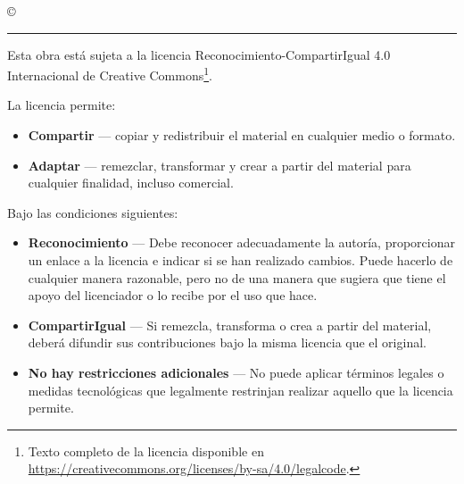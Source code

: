 \thispagestyle{empty}

\hfill

\vfill

\textit{\myTitle} \copyright\ \myTime \myName \\ \bigskip

\par\vspace*{\dimexpr-\parskip-\baselineskip+6pt}
\noindent\rule{\textwidth}{0.5pt}

Esta obra está sujeta a la licencia Reconocimiento-CompartirIgual 4.0 Internacional de Creative Commons\footnote{Texto completo de la licencia disponible en \url{https://creativecommons.org/licenses/by-sa/4.0/legalcode}.}.

La licencia permite:
\begin{itemize}
	\item[] \textbf{Compartir} --- copiar y redistribuir el material en cualquier medio o formato.
	\item[] \textbf{Adaptar} --- remezclar, transformar y crear a partir del material
para cualquier finalidad, incluso comercial.
\end{itemize}

Bajo las condiciones siguientes:
\begin{itemize}
	\item[] \textbf{Reconocimiento} --- Debe reconocer adecuadamente la autoría, proporcionar un enlace a la licencia e indicar si se han realizado cambios. Puede hacerlo de cualquier manera razonable, pero no de una manera que sugiera que tiene el apoyo del licenciador o lo recibe por el uso que hace. 
	\item[] \textbf{CompartirIgual} --- Si remezcla, transforma o crea a partir del material, deberá difundir sus contribuciones bajo la misma licencia que el original.
	\item[] \textbf{No hay restricciones adicionales} --- No puede aplicar términos legales o medidas tecnológicas que legalmente restrinjan realizar aquello que la licencia permite.
\end{itemize}
\clearpage
